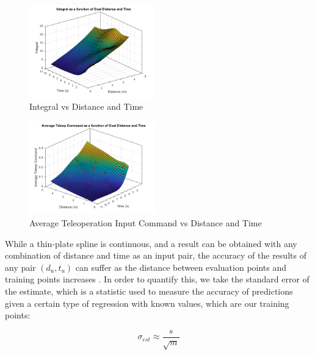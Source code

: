 \documentclass[letterpaper, 10 pt, conference]{ieeeconf}  %
\begin{document}
\begin{figure}[ht]
    \includegraphics[width=0.48\textwidth]{images/integs.png}
    \caption{Integral vs Distance and Time}
    \label{fig:integs}
\end{figure}
\begin{figure}[ht]
    \includegraphics[width=0.48\textwidth]{images/joycmds.png}
    \caption{Average Teleoperation Input Command vs Distance and Time}
    \label{fig:joys}
\end{figure}

While a thin-plate spline is continuous, and a result can be obtained with any combination of distance and time as an input pair, the accuracy of the results of any pair $(d_u,t_u)$ can suffer as the distance between evaluation points and training points increases \cite{regress}. In order to quantify this, we take the standard error of the estimate, which is a statistic used to measure the accuracy of predictions given a certain type of regression \cite{stdereg} with known values, which are our training points:

\begin{equation} \label{eq:stderr}
    \sigma_{est} \approx \frac{s}{\sqrt{m}}
\end{equation}
\end{document}
